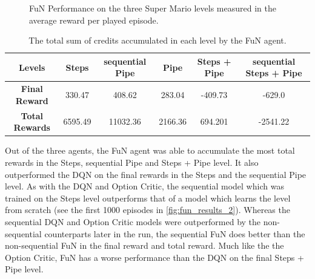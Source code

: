 \documentclass[notitlepage,a4paper,11pt]{article}
\begin{document}
\begin{figure}[htb!]
\begin{subfigure}[t]{0.32\textwidth}
         \caption{}
         \label{fig:fun_results_3}
     \end{subfigure}
        \caption{FuN Performance on the three Super Mario levels measured in the average reward per played episode.}
        \label{fig:fun_results}
        
\end{figure}

\begin{table}[htb!]
\centering
\begin{tabular}{ |c|c|c|c|c|c| } 
	\hline
	\textbf{Levels} & Steps & sequential Pipe  & Pipe & Steps + Pipe & sequential Steps + Pipe \\
	\hline
	\textbf{Final Reward} & 330.47 & 408.62 & 283.04 & -409.73 & -629.0 \\
	\hline
	\textbf{Total Rewards} & 6595.49 & 11032.36 & 2166.36 & 694.201 & -2541.22 \\
	\hline
\end{tabular}
\caption{The total sum of credits accumulated in each level by the FuN agent.}


\end{table}

Out of the three agents, the FuN agent was able to accumulate the most total rewards in the Steps, sequential Pipe and Steps + Pipe level. It also outperformed the DQN on the final rewards in the Steps and the sequential Pipe level. As with the DQN and Option Critic, the sequential model which was trained on the Steps level outperforms that of a model which learns the level from scratch (see the first 1000 episodes in \ref{fig:fun_results_2}). Whereas the sequential DQN and Option Critic models were outperformed by the non-sequential counterparts later in the run, the sequential FuN does better than the non-sequential FuN in the final reward and total reward. Much like the the Option Critic, FuN has a worse performance than the DQN on the final Steps + Pipe level. 
\end{document}
